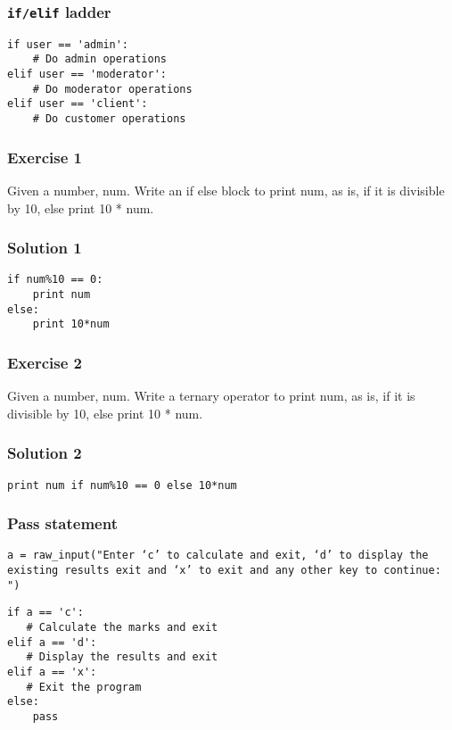\documentclass[17pt,compress]{beamer}
\begin{document}
\begin{frame}[fragile]
\frametitle{\verb~if/elif~ ladder}
\label{sec-4}

\lstset{language=Python}
\begin{lstlisting}
if user == 'admin':
    # Do admin operations
elif user == 'moderator':
    # Do moderator operations
elif user == 'client':
    # Do customer operations
\end{lstlisting}
\end{frame} 
\begin{frame}
\frametitle{Exercise 1}
\label{sec-5}

  Given a number, num. Write an if else block to print num, as is, if
  it is divisible by 10, else print 10 * num.
\end{frame}
\begin{frame}[fragile]
\frametitle{Solution 1}
\label{sec-6}

\lstset{language=Python}
\begin{lstlisting}
if num%10 == 0: 
    print num   
else:           
    print 10*num
\end{lstlisting}
\end{frame}
\begin{frame}
\frametitle{Exercise 2}
\label{sec-7}

  Given a number, num. Write a ternary operator to print num, as is,
  if it is divisible by 10, else print 10 * num.
\end{frame}
\begin{frame}[fragile]
\frametitle{Solution 2}
\label{sec-8}

\lstset{language=Python}
\begin{small}
\begin{lstlisting}
print num if num%10 == 0 else 10*num
\end{lstlisting}
\end{small}
\end{frame}
\begin{frame}[fragile]
\frametitle{Pass statement}
\label{sec-9}

\begin{footnotesize}
\texttt{a = raw\_input("Enter `c' to calculate and exit, `d' to display the existing results exit and `x' to exit and any other key to continue: ")}
\lstset{language=Python}
\begin{lstlisting}
if a == 'c':
   # Calculate the marks and exit
elif a == 'd':
   # Display the results and exit
elif a == 'x':
   # Exit the program
else:
    pass
\end{lstlisting}
\end{footnotesize}
\end{frame}
\end{document}
